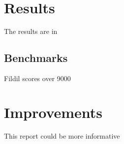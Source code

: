 \documentclass[10pt, a4paper]{article}
\begin{document}
\section{Results}

The results are in

\subsection{Benchmarks}

Fildil scores over 9000

\section{Improvements}

This report could be more informative

\newpage


\end{document}

